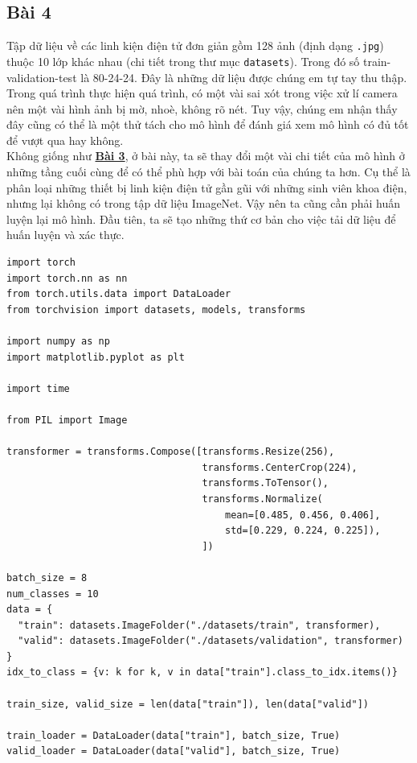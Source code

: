 \documentclass[a4paper]{article}
\begin{document}
\subsection{Bài 4}
Tập dữ liệu về các linh kiện điện tử đơn giản gồm 128 ảnh (định dạng \texttt{.jpg}) thuộc 10 lớp khác nhau (chi tiết trong thư mục \texttt{datasets}). Trong đó số train-validation-test là 80-24-24. Đây là những dữ liệu được chúng em tự tay thu thập. Trong quá trình thực hiện quá trình, có một vài sai xót trong việc xử lí camera nên một vài hình ảnh bị mờ, nhoè, không rõ nét. Tuy vậy, chúng em nhận thấy đây cũng có thể là một thử tách cho mô hình để đánh giá xem mô hình có đủ tốt để vượt qua hay không.\\
Không giống như \hyperref[bai3]{\textbf{Bài 3}}, ở bài này, ta sẽ thay đổi một vài chi tiết của mô hình ở những tầng cuối cùng để có thể phù hợp với bài toán của chúng ta hơn. Cụ thể là phân loại những thiết bị linh kiện điện tử gần gũi với những sinh viên khoa điện, nhưng lại không có trong tập dữ liệu ImageNet. Vậy nên ta cũng cần phải huấn luyện lại mô hình. Đầu tiên, ta sẽ tạo những thứ cơ bản cho việc tải dữ liệu để huấn luyện và xác thực.
\begin{lstlisting}
import torch
import torch.nn as nn
from torch.utils.data import DataLoader
from torchvision import datasets, models, transforms

import numpy as np
import matplotlib.pyplot as plt

import time

from PIL import Image

transformer = transforms.Compose([transforms.Resize(256),
                                  transforms.CenterCrop(224),
                                  transforms.ToTensor(),
                                  transforms.Normalize(
                                      mean=[0.485, 0.456, 0.406],
                                      std=[0.229, 0.224, 0.225]),
                                  ])

batch_size = 8
num_classes = 10
data = {
  "train": datasets.ImageFolder("./datasets/train", transformer),
  "valid": datasets.ImageFolder("./datasets/validation", transformer)
}
idx_to_class = {v: k for k, v in data["train"].class_to_idx.items()}

train_size, valid_size = len(data["train"]), len(data["valid"])

train_loader = DataLoader(data["train"], batch_size, True)
valid_loader = DataLoader(data["valid"], batch_size, True)
\end{lstlisting}
\end{document}
